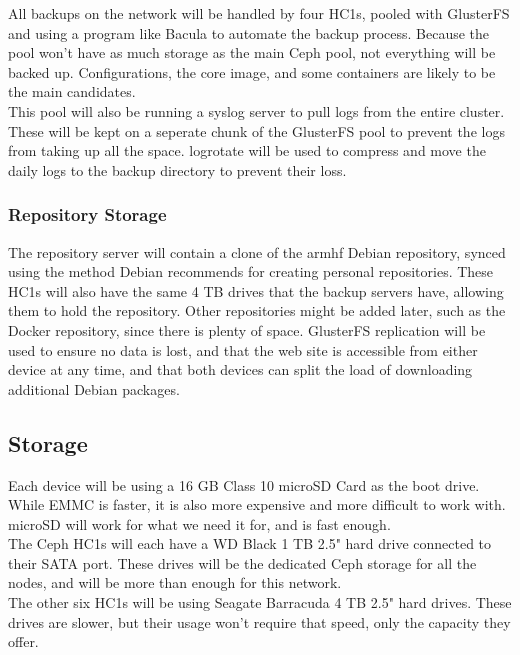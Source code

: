 \documentclass[12pt]{spieman}  %
\begin{document}
All backups on the network will be handled by four HC1s, pooled with GlusterFS and using a program like Bacula to automate the backup process. Because the pool won't have as much storage as the main Ceph pool, not everything will be backed up. Configurations, the core image, and some containers are likely to be the main candidates.\\

This pool will also be running a syslog server to pull logs from the entire cluster. These will be kept on a seperate chunk of the GlusterFS pool to prevent the logs from taking up all the space. logrotate will be used to compress and move the daily logs to the backup directory to prevent their loss.

\subsubsection{Repository Storage}
\label{subsubsec:arm-usage-repo}

The repository server will contain a clone of the armhf Debian repository, synced using the method Debian recommends for creating personal repositories. These HC1s will also have the same 4 TB drives that the backup servers have, allowing them to hold the repository. Other repositories might be added later, such as the Docker repository, since there is plenty of space. GlusterFS replication will be used to ensure no data is lost, and that the web site is accessible from either device at any time, and that both devices can split the load of downloading additional Debian packages.

\subsection{Storage}
\label{subsec:arm-storage}

Each device will be using a 16 GB Class 10 microSD Card as the boot drive. While EMMC is faster, it is also more expensive and more difficult to work with. microSD will work for what we need it for, and is fast enough.\\

The Ceph HC1s will each have a WD Black 1 TB 2.5" hard drive connected to their SATA port. These drives will be the dedicated Ceph storage for all the nodes, and will be more than enough for this network.\\

The other six HC1s will be using Seagate Barracuda 4 TB 2.5" hard drives. These drives are slower, but their usage won't require that speed, only the capacity they offer.
\end{document}
